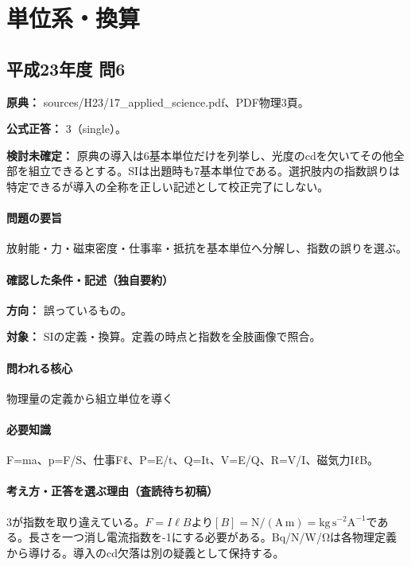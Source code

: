 \section{単位系・換算}

\subsection{平成23年度 問6}
\label{q:h23-reg-applied-06}

\noindent\textbf{原典：} sources/H23/17\_applied\_science.pdf、PDF物理3頁。

\textbf{公式正答：} 3（single）。

\par\textbf{検討未確定：} 原典の導入は6基本単位だけを列挙し、光度のcdを欠いてその他全部を組立できるとする。SIは出題時も7基本単位である。選択肢内の指数誤りは特定できるが導入の全称を正しい記述として校正完了にしない。

\paragraph{問題の要旨} 放射能・力・磁束密度・仕事率・抵抗を基本単位へ分解し、指数の誤りを選ぶ。

\paragraph{確認した条件・記述（独自要約）}\mbox{}\par

\noindent\textbf{方向：} 誤っているもの。\par

\noindent\textbf{対象：} SIの定義・換算。定義の時点と指数を全肢画像で照合。\par

\paragraph{問われる核心} 物理量の定義から組立単位を導く

\paragraph{必要知識} F=\allowbreak{}ma、p=\allowbreak{}F/S、仕事Fℓ、P=\allowbreak{}E/t、Q=\allowbreak{}It、V=\allowbreak{}E/Q、R=\allowbreak{}V/I、磁気力IℓB。

\paragraph{考え方・正答を選ぶ理由（査読待ち初稿）} 3が指数を取り違えている。\(F=I\ell B\)より\([B]=\mathrm{N/(A\,m)=kg\,s^{-2}A^{-1}}\)である。長さを一つ消し電流指数を-1にする必要がある。Bq/N/W/Ωは各物理定義から導ける。導入のcd欠落は別の疑義として保持する。

